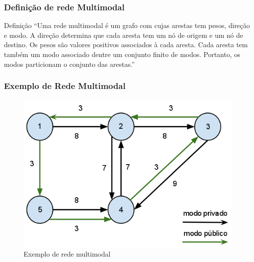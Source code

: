 \frame
{
\frametitle{Definição de rede Multimodal}
\begin{block}{Definição}
``Uma rede multimodal é um grafo com cujas arestas tem pesos, direção e modo. A direção determina que cada aresta tem um nó de origem e um nó de destino.
Os pesos são valores positivos associados à cada aresta. Cada aresta tem também um modo associado dentre um conjunto finito de modos. Portanto, os modos particionam o conjunto das arestas.''
\end{block}
}

\frame
{
\frametitle{Exemplo de Rede Multimodal}
	\begin{figure}
		\includegraphics[width=.8\textwidth]{./imgs/multimodal.png}
		\caption{Exemplo de rede multimodal}
	\end{figure}
}
